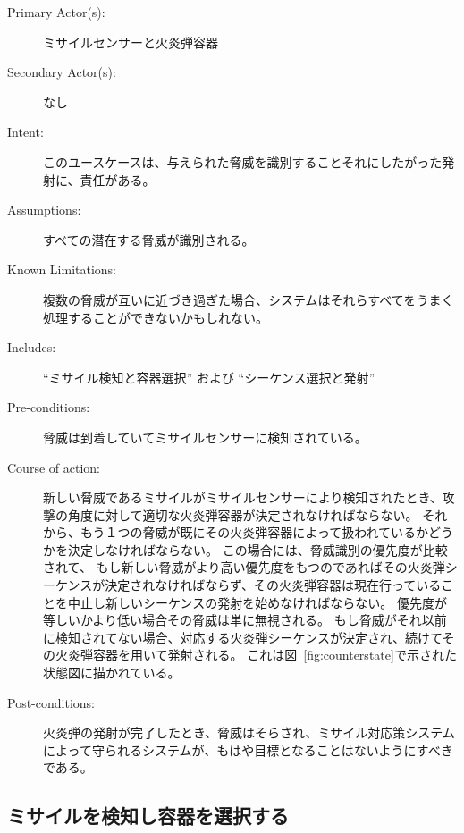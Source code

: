 \documentclass[\pformat,12pt]{jreport}
\begin{document}
\begin{description}
\item[Primary Actor(s):] ミサイルセンサーと火炎弾容器
\item[Secondary Actor(s):] なし
\item[Intent:] このユースケースは、与えられた脅威を識別することそれにしたがった発射に、責任がある。
\item[Assumptions:] すべての潜在する脅威が識別される。
\item[Known Limitations:] 複数の脅威が互いに近づき過ぎた場合、システムはそれらすべてをうまく処理することができないかもしれない。
\item[Includes:] ``ミサイル検知と容器選択'' および ``シーケンス選択と発射''
\item[Pre-conditions:] 脅威は到着していてミサイルセンサーに検知されている。
\item[Course of action:] 新しい脅威であるミサイルがミサイルセンサーにより検知されたとき、攻撃の角度に対して適切な火炎弾容器が決定されなければならない。
それから、もう１つの脅威が既にその火炎弾容器によって扱われているかどうかを決定しなければならない。
この場合には、脅威識別の優先度が比較されて、
もし新しい脅威がより高い優先度をもつのであればその火炎弾シーケンスが決定されなければならず、その火炎弾容器は現在行っていることを中止し新しいシーケンスの発射を始めなければならない。
優先度が等しいかより低い場合その脅威は単に無視される。
もし脅威がそれ以前に検知されてない場合、対応する火炎弾シーケンスが決定され、続けてその火炎弾容器を用いて発射される。
これは図~\ref{fig:counterstate}で示された状態図に描かれている。
\item[Post-conditions:] 火炎弾の発射が完了したとき、脅威はそらされ、ミサイル対応策システムによって守られるシステムが、もはや目標となることはないようにすべきである。
\end{description}

\subsection{ミサイルを検知し容器を選択する}
\end{document}
